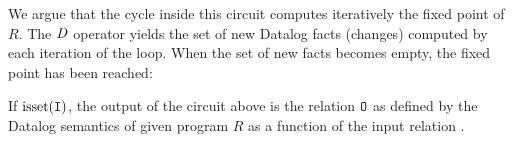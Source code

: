 \begin{algorithm}
\begin{enumerate}[nosep, leftmargin=\parindent]
\begin{center}
\end{center}
\end{enumerate}
\end{algorithm}

We argue that the cycle inside this circuit computes iteratively the fixed point of $R$.
The $\mathit{D}$ operator yields the set of new Datalog facts (changes) computed by each iteration of the loop.
When the set of new facts becomes empty, the fixed point has been reached:

\begin{theorem}\label{theorem:recursion}
If $\mbox{isset}(\mbox{\texttt{I}})$, the output of the circuit above is
the relation $\mbox{\texttt{O}}$ as defined by the Datalog semantics of given program
$R$ as a function of the input relation .
\end{theorem}
\label{proof-recursion}
%
%


